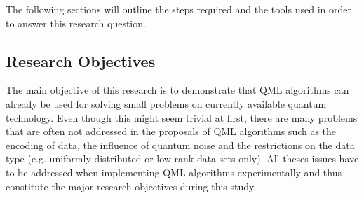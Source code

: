 \documentclass[a4paper]{article}
\newcommand*{\0}{$\ket{0}$}
\newcommand*{\1}{$\ket{1}$}
\begin{document}

\flushleft
The following sections will outline the steps required and the tools used in order to answer this research question. 

\subsection{Research Objectives}
\label{subsec:researchobjectives}

The main objective of this research is to demonstrate that QML algorithms can already be used for solving small problems on currently available quantum technology. Even though this might seem trivial at first, there are many problems that are often not addressed in the proposals of QML algorithms such as the encoding of data, the influence of quantum noise and the restrictions on the data type (e.g. uniformly distributed or low-rank data sets only). All theses issues have to be addressed when implementing QML algorithms experimentally and thus constitute the major research objectives during this study. 



\end{document}
